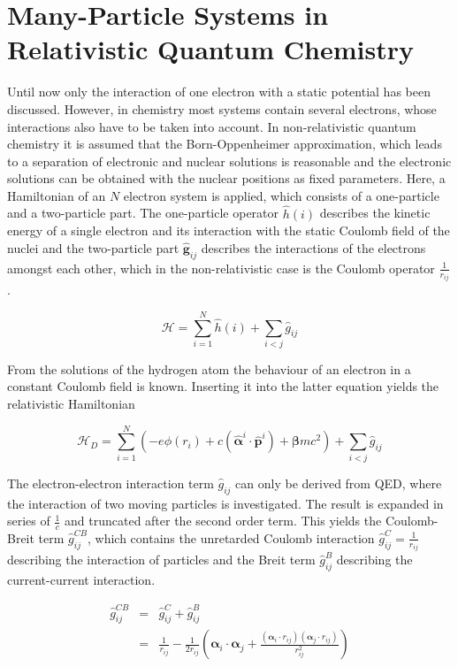 \section{Many-Particle Systems in Relativistic Quantum Chemistry}
Until now only the interaction of one electron with a static potential has been
discussed. However, in chemistry most systems contain several electrons, whose
interactions also have to be taken into account.
In non-relativistic quantum chemistry it is assumed that the Born-Oppenheimer
approximation, which leads to a separation of electronic and nuclear solutions
is reasonable and the electronic solutions can be obtained with the
nuclear positions as fixed parameters.
Here, a Hamiltonian of an $N$ electron system is applied, which consists
of a one-particle and a two-particle part. The one-particle operator $\hat{h}(i)$
describes the kinetic energy of a single electron and its interaction with the
static Coulomb field of the nuclei and the two-particle part $\mathbf{\hat{g}}_{ij}$
describes the interactions of the electrons amongst each other, which in the
non-relativistic case is the Coulomb operator $\frac1{r_{ij}}$.

\begin{equation}
\mathcal{H}= \sum\limits_{i=1}^N \hat{h}(i) + \sum\limits_{i<j} {\hat{g}}_{ij}
\end{equation}

From the solutions of the hydrogen atom the behaviour of an electron in a constant
Coulomb field is known. Inserting it into the latter equation yields the
relativistic Hamiltonian

\begin{equation}
\mathcal{H}_{D}= \sum\limits_{i=1}^N (-e \phi(r_i)+
                 c(\hat{\boldsymbol{\alpha}}^{i}\cdot\hat{\mathbf{p}}^{i})
                 +\boldsymbol{\beta}mc^2)
                 + \sum\limits_{i<j} {\hat{g}}_{ij}
\end{equation}

The electron-electron interaction term ${\hat{g}}_{ij}$ can only be derived
from \ac{QED}, where the interaction of two moving particles is investigated.
The result is expanded in series of $\frac1c$ and truncated after the second
order term. This yields the Coulomb-Breit term $\hat{g}_{ij}^{CB}$, which
contains the unretarded Coulomb interaction $\hat{g}_{ij}^C=\frac1{r_{ij}}$
describing the interaction of particles and
the Breit term $\hat{g}_{ij}^B$ describing the current-current interaction.

\begin{equation}\begin{array}{rcl}
\hat{g}_{ij}^{CB} &=& \hat{g}_{ij}^C + \hat{g}_{ij}^B\\
                &=& \frac1{r_{ij}} - \frac1{2r_{ij}}\left(\boldsymbol{\alpha}_i
                    \cdot\boldsymbol{\alpha}_j+\frac{(\boldsymbol{\alpha}_i
                    \cdot r_{ij})(\boldsymbol{\alpha}_j\cdot r_{ij})}
                    {r^2_{ij}}\right)
\end{array}\end{equation}

